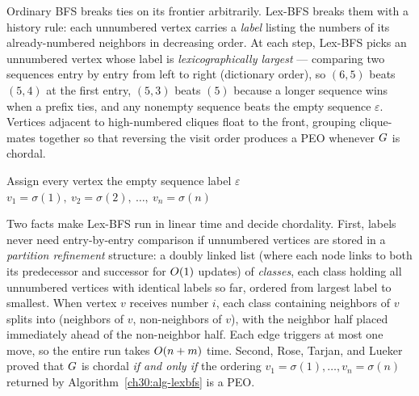 \begin{intuitionbox}
Ordinary BFS breaks ties on its frontier arbitrarily. Lex-BFS breaks them with a history rule: each unnumbered vertex carries a \emph{label} listing the numbers of its already-numbered neighbors in decreasing order. At each step, Lex-BFS picks an unnumbered vertex whose label is \emph{lexicographically largest} --- comparing two sequences entry by entry from left to right (dictionary order), so $(6,5)$ beats $(5,4)$ at the first entry, $(5,3)$ beats $(5)$ because a longer sequence wins when a prefix ties, and any nonempty sequence beats the empty sequence $\varepsilon$. Vertices adjacent to high-numbered cliques float to the front, grouping clique-mates together so that reversing the visit order produces a PEO whenever $G$ is chordal.
\end{intuitionbox}

\begin{algorithm}[H]
\caption{Lex-BFS: produces a candidate PEO $v_1=\sigma(1),\dots,v_n=\sigma(n)$}
\label{ch30:alg-lexbfs}
Assign every vertex the empty sequence label $\varepsilon$\;
\Return $v_1=\sigma(1),\ v_2=\sigma(2),\ \dots,\ v_n=\sigma(n)$\;
\end{algorithm}

Two facts make Lex-BFS run in linear time and decide chordality. First, labels never need entry-by-entry comparison if unnumbered vertices are stored in a \emph{partition refinement} structure: a doubly linked list (where each node links to both its predecessor and successor for $O(1)$ updates) of \emph{classes}, each class holding all unnumbered vertices with identical labels so far, ordered from largest label to smallest. When vertex $v$ receives number $i$, each class containing neighbors of $v$ splits into (neighbors of $v$, non-neighbors of $v$), with the neighbor half placed immediately ahead of the non-neighbor half. Each edge triggers at most one move, so the entire run takes $O(n+m)$ time. Second, Rose, Tarjan, and Lueker proved that $G$ is chordal \emph{if and only if} the ordering $v_1=\sigma(1),\dots,v_n=\sigma(n)$ returned by Algorithm~\ref{ch30:alg-lexbfs} is a PEO.


